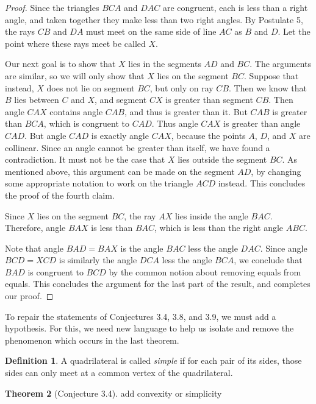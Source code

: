 \documentclass{tufte-handout}
\theoremstyle{definition}
\newtheorem{theorem}{Theorem}[section]
\newtheorem{definition}[theorem]{Definition}
\begin{document}
\begin{proof}
Since the triangles $BCA$ and $DAC$ are congruent, each is less than a right angle, and taken together they make less than two right angles. By Postulate 5, the rays $CB$ and $DA$ must meet on the same side of line $AC$ as $B$ and $D$. Let the point where these rays meet be called $X$.

Our next goal is to show that $X$ lies in the segments $AD$ and $BC$. The arguments are similar, so we will only show that $X$ lies on the segment $BC$. Suppose that instead, $X$ does not lie on segment $BC$, but only on ray $CB$. Then we know that $B$ lies between $C$ and $X$, and segment $CX$ is greater than segment $CB$. Then angle $CAX$ contains angle $CAB$, and thus is greater than it. But $CAB$ is greater than $BCA$, which is congruent to $CAD$. Thus angle $CAX$ is greater than angle $CAD$. But angle $CAD$ is exactly angle $CAX$, because the points $A$, $D$, and $X$ are collinear. Since an angle cannot be greater than itself, we have found a contradiction. It must not be the case that $X$ lies outside the segment $BC$. As mentioned above, this argument can be made on the segment $AD$, by changing some appropriate notation to work on the triangle $ACD$ instead. This concludes the proof of the fourth claim.

Since $X$ lies on the segment $BC$, the ray $AX$ lies inside the angle $BAC$. Therefore, angle $BAX$ is less than $BAC$, which is less than the right angle $ABC$.

Note that angle $BAD = BAX$ is the angle $BAC$ less the angle $DAC$. Since angle $BCD = XCD$ is similarly the angle $DCA$ less the angle $BCA$, we conclude that $BAD$ is congruent to $BCD$ by the common notion about removing equals from equals.
This concludes the argument for the last part of the result, and completes our proof.
\end{proof}



To repair the statements of Conjectures 3.4, 3.8, and 3.9, we must add a hypothesis. For this, we need new language to help us isolate and remove the phenomenon which occurs in the last theorem.


\begin{definition}
A quadrilateral is called \emph{simple} if for each pair of its sides, those sides can only meet at a common vertex of the quadrilateral.
\end{definition}


\begin{theorem}[Conjecture 3.4]
add convexity or simplicity
\end{theorem}
\end{document}
